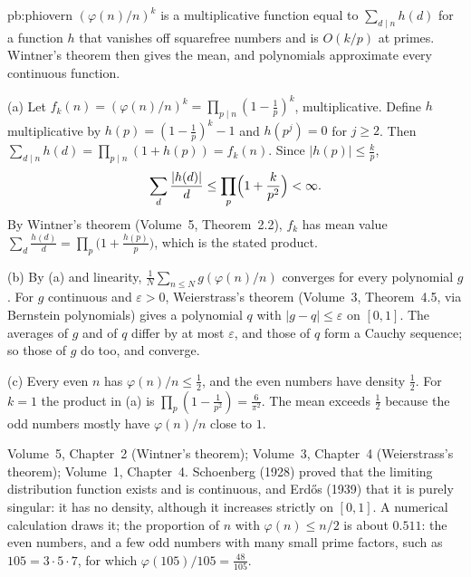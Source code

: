 \begin{solution}{pb:phiovern}
\idea $(\varphi(n)/n)^k$ is a multiplicative function equal to $\sum_{d\mid n}h(d)$ for a function $h$ that vanishes off squarefree
numbers and is $O(k/p)$ at primes. Wintner's theorem then gives the mean, and polynomials approximate every continuous function.

\writeup (a) Let $f_k(n)=(\varphi(n)/n)^k=\prod_{p\mid n}(1-\frac1p)^k$, multiplicative. Define $h$ multiplicative by
$h(p)=(1-\frac1p)^k-1$ and $h(p^j)=0$ for $j\ge2$. Then $\sum_{d\mid n}h(d)=\prod_{p\mid n}(1+h(p))=f_k(n)$. Since $|h(p)|\le\frac kp$,
\[
\sum_d\frac{|h(d)|}d\le\prod_p\Bigl(1+\frac k{p^2}\Bigr)<\infty.
\]
By Wintner's theorem (Volume~5, Theorem~2.2), $f_k$ has mean value $\sum_d\frac{h(d)}d=\prod_p\bigl(1+\frac{h(p)}p\bigr)$, which is the
stated product.

(b) By (a) and linearity, $\frac1N\sum_{n\le N}g(\varphi(n)/n)$ converges for every polynomial $g$. For $g$ continuous and
$\varepsilon>0$, Weierstrass's theorem (Volume~3, Theorem~4.5, via Bernstein polynomials) gives a polynomial $q$ with
$|g-q|\le\varepsilon$ on $[0,1]$. The averages of $g$ and of $q$ differ by at most $\varepsilon$, and those of $q$ form a Cauchy
sequence; so those of $g$ do too, and converge.

(c) Every even $n$ has $\varphi(n)/n\le\frac12$, and the even numbers have density $\frac12$. For $k=1$ the product in (a) is
$\prod_p(1-\frac1{p^2})=\frac6{\pi^2}$. The mean exceeds $\frac12$ because the odd numbers mostly have $\varphi(n)/n$ close to $1$.

\tools Volume~5, Chapter~2 (Wintner's theorem); Volume~3, Chapter~4 (Weierstrass's theorem); Volume~1, Chapter~4.
\leads Schoenberg (1928) proved that the limiting distribution function exists and is continuous, and Erdős (1939) that it is
purely singular: it has no density, although it increases strictly on $[0,1]$. A numerical calculation draws it; the proportion of $n$ with
$\varphi(n)\le n/2$ is about $0.511$: the even numbers, and a few odd numbers with many small prime factors, such as
$105=3\cdot5\cdot7$, for which $\varphi(105)/105=\frac{48}{105}$.
\end{solution}

